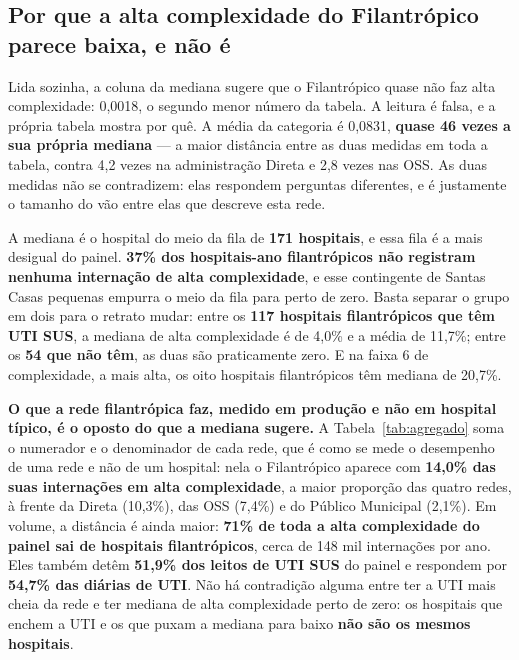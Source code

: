 \subsection*{Por que a alta complexidade do Filantrópico parece baixa, e não é}

Lida sozinha, a coluna da mediana sugere que o Filantrópico quase não faz
alta complexidade: 0,0018, o segundo menor número da tabela. A leitura é
falsa, e a própria tabela mostra por quê. A média da categoria é 0,0831,
\textbf{quase 46 vezes a sua própria mediana} --- a maior distância entre as
duas medidas em toda a tabela, contra 4,2 vezes na administração Direta e
2,8 vezes nas OSS. As duas medidas não se contradizem: elas respondem
perguntas diferentes, e é justamente o tamanho do vão entre elas que
descreve esta rede.

A mediana é o hospital do meio da fila de \textbf{171 hospitais}, e essa
fila é a mais desigual do painel. \textbf{37\% dos hospitais-ano
filantrópicos não registram nenhuma internação de alta complexidade}, e
esse contingente de Santas Casas pequenas empurra o meio da fila para
perto de zero. Basta separar o grupo em dois para o retrato mudar: entre os
\textbf{117 hospitais filantrópicos que têm UTI SUS}, a mediana de alta
complexidade é de 4,0\% e a média de 11,7\%; entre os \textbf{54 que não
têm}, as duas são praticamente zero. E na faixa 6 de complexidade, a mais
alta, os oito hospitais filantrópicos têm mediana de 20,7\%.

\textbf{O que a rede filantrópica faz, medido em produção e não em
hospital típico, é o oposto do que a mediana sugere.} A
Tabela~\ref{tab:agregado} soma o numerador e o denominador de cada rede,
que é como se mede o desempenho de uma rede e não de um hospital: nela o
Filantrópico aparece com \textbf{14,0\% das suas internações em alta
complexidade}, a maior proporção das quatro redes, à frente da Direta
(10,3\%), das OSS (7,4\%) e do Público Municipal (2,1\%). Em volume, a
distância é ainda maior: \textbf{71\% de toda a alta complexidade do painel
sai de hospitais filantrópicos}, cerca de 148 mil internações por ano. Eles
também detêm \textbf{51,9\% dos leitos de UTI SUS} do painel e respondem
por \textbf{54,7\% das diárias de UTI}. Não há contradição alguma entre ter
a UTI mais cheia da rede e ter mediana de alta complexidade perto de zero:
os hospitais que enchem a UTI e os que puxam a mediana para baixo
\textbf{não são os mesmos hospitais}.

